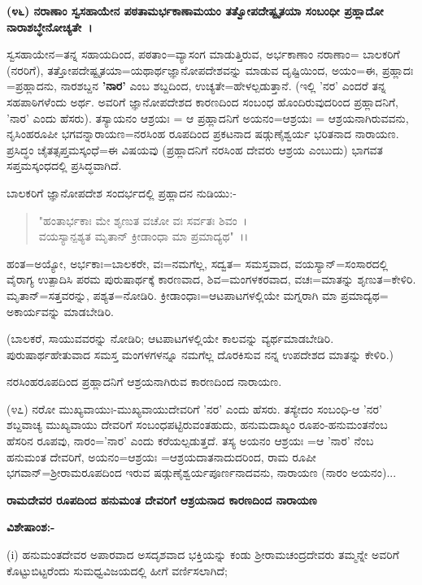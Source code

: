 \textbf{(೪೬) ನರಾಣಾಂ ಸ್ವಸಹಾಯೇನ ಪಠತಾಮರ್ಭಕಾಣಾಮಯಂ ತತ್ವೋಪದೇಷ್ಟೃತಯಾ ಸಂಬಂಧೀ ಪ್ರಹ್ಲಾದೋ ನಾರಾಶಬ್ಧೇನೋಚ್ಯತೇ~।}

ಸ್ವಸಹಾಯೇನ=ತನ್ನ ಸಹಾಯದಿಂದ, ಪಠತಾಂ=ವ್ಯಾಸಂಗ ಮಾಡುತ್ತಿರುವ, ಅರ್ಭಕಾಣಾಂ ನರಾಣಾಂ= ಬಾಲಕರಿಗೆ (ನರರಿಗೆ), ತತ್ತೋಪದೇಷ್ಟೃತಯಾ=ಯಥಾರ್ಥಜ್ಞಾನೋಪದೇಶವನ್ನು ಮಾಡುವ ದೃಷ್ಟಿಯಿಂದ, ಅಯಂ=ಈ, ಪ್ರಹ್ಲಾದಃ =ಪ್ರಹ್ಲಾದನು, ನಾರಶಬ್ದನ \textbf{'ನಾರ'} ಎಂಬ ಶಬ್ದದಿಂದ, ಉಚ್ಯತೇ=ಹೇಳಲ್ಪಡುತ್ತಾನೆ. (ಇಲ್ಲಿ 'ನರ' ಎಂದರೆ ತನ್ನ ಸಹಪಾಠಿಗಳೆಂದು ಅರ್ಥ. ಅವರಿಗೆ ಜ್ಞಾನೋಪದೇಶದ ಕಾರಣದಿಂದ ಸಂಬಂಧ ಹೊಂದಿರುವುದರಿಂದ ಪ್ರಹ್ಲಾದನಿಗೆ, 'ನಾರ' ಎಂದು ಹೆಸರು). ತಸ್ಯಾಯನಂ ಆಶ್ರಯಃ = ಆ ಪ್ರಹ್ಲಾದನಿಗೆ ಅಯನಂ=ಆಶ್ರಯಃ = ಆಶ್ರಯನಾಗಿರುವವನು, ನೃಸಿಂಹರೂಪೀ ಭಗವನ್ನಾರಾಯಣ=ನರಸಿಂಹ ರೂಪದಿಂದ ಪ್ರಕಟನಾದ ಷಡ್ಗುಣೈಶ್ವರ್ಯ ಭರಿತನಾದ ನಾರಾಯಣ. ಪ್ರಸಿದ್ಧಂ ಚೈತತ್ಸಪ್ತಮಸ್ಕಂಧೆ=ಈ ವಿಷಯವು (ಪ್ರಹ್ಲಾದನಿಗೆ ನರಸಿಂಹ ದೇವರು ಆಶ್ರಯ ಎಂಬುದು) ಭಾಗವತ ಸಪ್ತಮಸ್ಕಂಧದಲ್ಲಿ ಪ್ರಸಿದ್ಧವಾಗಿದೆ.

ಬಾಲಕರಿಗೆ ಜ್ಞಾನೋಪದೇಶ ಸಂದರ್ಭದಲ್ಲಿ ಪ್ರಹ್ಲಾದನ ನುಡಿಯು:-

\begin{verse}
"ಹಂತಾರ್ಭಕಾಃ ಮೇ ಶೃಣುತ ವಚೋ ವಃ ಸರ್ವತಃ ಶಿವಂ~।\\ ವಯಸ್ಯಾನ್ಪಶ್ಯತ ಮೃತಾನ್ ಕ್ರೀಡಾಂಧಾ ಮಾ ಪ್ರಮಾದ್ಯಥ"~।।
\end{verse}

ಹಂತ=ಅಯ್ಯೋ, ಅರ್ಭಕಾಃ=ಬಾಲಕರೇ, ವಃ=ನಮಗೆಲ್ಲ, ಸದ್ವತ= ಸಮಸ್ತವಾದ, ವಯಸ್ಯಾನ್=ಸಂಸಾರದಲ್ಲಿ ವೈರಾಗ್ಯ ಉತ್ಪಾದಿಸಿ ಪರಮ ಪುರುಷಾರ್ಥಕ್ಕೆ ಕಾರಣವಾದ, ಶಿವ=ಮಂಗಳಕರವಾದ, ವಚಃ=ಮಾತನ್ನು ಶೃಣುತ=ಕೇಳಿರಿ. ಮೃತಾನ್=ಸತ್ತವರನ್ನು, ಪಶ್ಯತ=ನೋಡಿರಿ. ಕ್ರೀಡಾಂಧಾಃ=ಆಟಪಾಟಗಳಲ್ಲಿಯೇ ಮಗ್ನರಾಗಿ ಮಾ ಪ್ರಮಾದ್ಯಥ= ಅಕಾರ್ಯವನ್ನು ಮಾಡಬೇಡಿರಿ.

(ಬಾಲಕರೆ, ಸಾಯುವವರನ್ನು ನೋಡಿರಿ; ಆಟಪಾಟಗಳಲ್ಲಿಯೇ ಕಾಲವನ್ನು ವ್ಯರ್ಥಮಾಡಬೇಡಿರಿ. ಪುರುಷಾರ್ಥಹೇತುವಾದ ಸಮಸ್ತ ಮಂಗಳಗಳನ್ನೂ ನಮಗೆಲ್ಲ ದೊರಕಿಸುವ ನನ್ನ ಉಪದೇಶದ ಮಾತನ್ನು ಕೇಳಿರಿ.)

ನರಸಿಂಹರೂಪದಿಂದ ಪ್ರಹ್ಲಾದನಿಗೆ ಆಶ್ರಯನಾಗಿರುವ ಕಾರಣದಿಂದ ನಾರಾಯಣ.

(೪೭) ನರೋ ಮುಖ್ಯವಾಯುಃ-ಮುಖ್ಯವಾಯುದೇವರಿಗೆ 'ನರ' ಎಂದು ಹೆಸರು. ತಸ್ಯೇದಂ ಸಂಬಂಧಿ-ಆ 'ನರ' ಶಬ್ದವಾಚ್ಯ ಮುಖ್ಯವಾಯು ದೇವರಿಗೆ ಸಂಬಂಧಪಟ್ಟಿರುವಂತಹುದು, ಹನುಮದಾಖ್ಯಂ ರೂಪಂ-ಹನುಮಂತನೆಂಬ ಹೆಸರಿನ ರೂಪವು, ನಾರಂ='ನಾರ' ಎಂದು ಕರೆಯಲ್ಪಡುತ್ತದೆ. ತಸ್ಯ ಅಯನಂ ಆಶ್ರಯಃ =ಆ 'ನಾರ' ನೆಂಬ ಹನುಮಂತ ದೇವರಿಗೆ, ಅಯನಂ=ಆಶ್ರಯಃ =ಆಶ್ರಯದಾತನಾದುದರಿಂದ, ರಾಮ ರೂಪೀ ಭಗವಾನ್=ಶ‍್ರೀರಾಮರೂಪದಿಂದ ಇರುವ ಷಡ್ಗುಣೈಶ್ವರ್ಯಪೂರ್ಣನಾದವನು, ನಾರಾಯಣ (ನಾರಂ ಅಯನಂ)...

\begin{center}
\textbf{ರಾಮದೇವರ ರೂಪದಿಂದ ಹನುಮಂತ ದೇವರಿಗೆ ಆಶ್ರಯನಾದ ಕಾರಣದಿಂದ ನಾರಾಯಣ}
\end{center}

\noindent
\textbf{ವಿಶೇಷಾಂಶ:-}

(i) ಹನುಮಂತದೇವರ ಅಪಾರವಾದ ಅಸದೃಶವಾದ ಭಕ್ತಿಯನ್ನು ಕಂಡು ಶ‍್ರೀರಾಮಚಂದ್ರದೇವರು ತಮ್ಮನ್ನೇ ಅವರಿಗೆ ಕೊಟ್ಟುಬಿಟ್ಟರೆಂದು ಸುಮಧ್ವವಿಜಯದಲ್ಲಿ ಹೀಗೆ ವರ್ಣಿಸಲಾಗಿದೆ;

